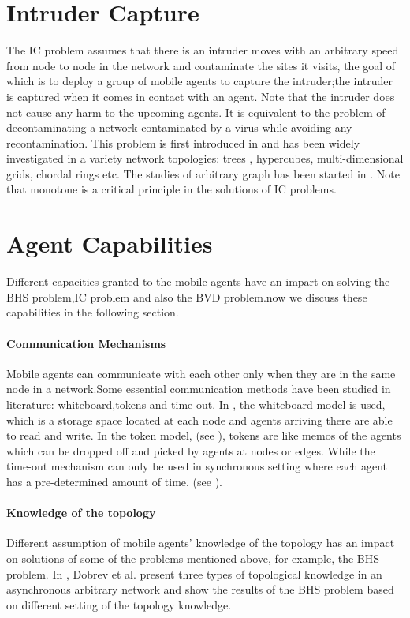 \section{Intruder Capture}
The IC problem assumes that there is an intruder moves with an arbitrary speed from node to node in the network and contaminate the sites it visits, the goal of which is to deploy a group of mobile agents to capture the intruder;the intruder is captured when it comes in contact with an agent. Note that the intruder does not cause any harm to the upcoming agents. It is equivalent to the problem of decontaminating a network contaminated by a virus while avoiding any recontamination. This problem is first introduced in \cite{Flocchini} and has been widely investigated in a variety network topologies: trees \cite{Flocchini, Flocchini1,treeintruder}, hypercubes\cite{Flocchini2}, multi-dimensional grids\cite{ Flocchini2}, chordal rings\cite{Flocchini3} etc. The studies of arbitrary graph has been started in \cite{Nisse,Nisse1}. Note that monotone is a critical principle in the solutions of IC problems.  

\section{Agent Capabilities}
Different capacities granted to the mobile agents have an impart on solving the BHS problem,IC problem and also the BVD problem.now we discuss these capabilities in the following section.

\paragraph{Communication Mechanisms} 
Mobile agents can communicate with each other only when they are in the same node in a network.Some essential communication methods have been studied in literature: whiteboard,tokens and time-out. In \cite{J.C, Dobr, Flocchini4, A.K}, the whiteboard model is used, which is a storage space located at each node and agents arriving there are able to read and write. In the token model, (see \cite{ J.C1, Flocchini4}), tokens are like memos of the agents which can be dropped off and picked by agents at nodes or edges. While the time-out mechanism can only be used in synchronous setting where each agent has a pre-determined amount of time. (see \cite{C.C, C.C1, J.C2}).

\paragraph{Knowledge of the topology} 
Different assumption of mobile agents' knowledge of the topology has an impact on solutions of some of the problems mentioned above, for example, the BHS problem. In \cite{Dobr}, Dobrev et al. present three types of topological knowledge in an asynchronous arbitrary network and show the results of the BHS problem based on different setting of the topology knowledge.


